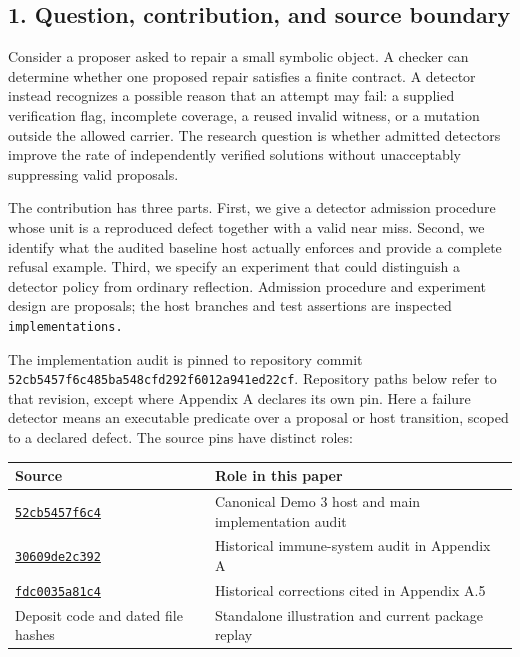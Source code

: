\documentclass[
  11pt,
]{article}
\newcommand{\passthrough}[1]{#1}
\begin{document}
\subsection{1. Question, contribution, and source
boundary}\label{question-contribution-and-source-boundary}

Consider a proposer asked to repair a small symbolic object. A checker
can determine whether one proposed repair satisfies a finite contract. A
detector instead recognizes a possible reason that an attempt may fail:
a supplied verification flag, incomplete coverage, a reused invalid
witness, or a mutation outside the allowed carrier. The research
question is whether admitted detectors improve the rate of independently
verified solutions without unacceptably suppressing valid proposals.

The contribution has three parts. First, we give a detector admission
procedure whose unit is a reproduced defect together with a valid near
miss. Second, we identify what the audited baseline host actually
enforces and provide a complete refusal example. Third, we specify an
experiment that could distinguish a detector policy from ordinary
reflection. Admission procedure and experiment design are proposals; the
host branches and test assertions are inspected
\nolinkurl{implementations.}

The implementation audit is pinned to repository commit
\nolinkurl{52cb5457f6c485ba548cfd292f6012a941ed22cf}. Repository paths
below refer to that revision, except where Appendix A declares its own
pin. Here a failure detector means an executable predicate over a
proposal or host transition, scoped to a declared defect. The source
pins have distinct roles:

\begin{longtable}[]{@{}
  >{\raggedright\arraybackslash}p{}
  >{\raggedright\arraybackslash}p{}@{}}
\toprule\noalign{}
\begin{minipage}[b]{\linewidth}\raggedright
Source
\end{minipage} & \begin{minipage}[b]{\linewidth}\raggedright
Role in this paper
\end{minipage} \\
\midrule\noalign{}
\endhead
\bottomrule\noalign{}
\endlastfoot
\href{https://github.com/dbccpage/the_symbol_game/tree/52cb5457f6c485ba548cfd292f6012a941ed22cf}{\passthrough{\lstinline!52cb5457f6c4!}}
& Canonical Demo 3 host and main implementation audit \\
\href{https://github.com/dbccpage/the_symbol_game/tree/30609de2c3928238715375a9bac608256fa381d8}{\passthrough{\lstinline!30609de2c392!}}
& Historical immune-system audit in Appendix A \\
\href{https://github.com/dbccpage/the_symbol_game/tree/fdc0035a81c45e10b900fc917b8b0710df81391f}{\passthrough{\lstinline!fdc0035a81c4!}}
& Historical corrections cited in Appendix A.5 \\
Deposit code and dated file hashes & Standalone illustration and current
package replay \\
\end{longtable}
\end{document}
